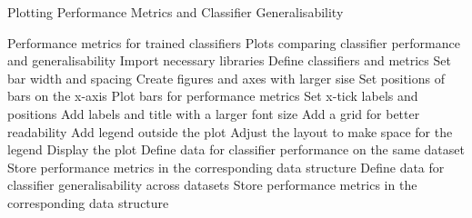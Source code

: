 \begin{algorithm}[ht]
    \caption{Plotting Performance Metrics and Classifier Generalisability}\label{alg:plotData}
    \begin{algorithmic}[1]
    \Require%
    Performance metrics for trained classifiers
    \Ensure%
    Plots comparing classifier performance and generalisability
        \State%
        Import necessary libraries
        \State%
        Define classifiers and metrics
        \State%
        Set bar width and spacing
        \State%
        Create figures and axes with larger sise
        \State%
        Set positions of bars on the x-axis
    \EndFunction%
            \State%
            Plot bars for performance metrics
        \EndFor%
        \State%
        Set x-tick labels and positions
        \State%
        Add labels and title with a larger font size
        \State%
        Add a grid for better readability
        \State%
        Add legend outside the plot
        \State%
        Adjust the layout to make space for the legend
        \State%
        Display the plot
    \EndFunction%
    \State%
    \State%
    Define data for classifier performance on the same dataset
        \State%
        Store performance metrics in the corresponding data structure
    \EndFor%
    \State%
    \State%
    \State%
    Define data for classifier generalisability across datasets
        \State%
        Store performance metrics in the corresponding data structure
    \EndFor%
    \State%
    \end{algorithmic}
\end{algorithm}